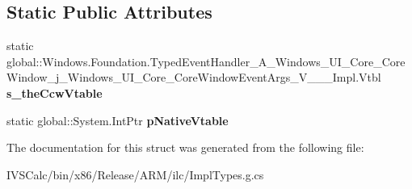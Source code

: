 \subsection*{Static Public Attributes}
\begin{DoxyCompactItemize}
\item 
\mbox{\label{struct_windows_1_1_foundation_1_1_typed_event_handler___a___windows___u_i___core___core_window__f96fd82f4e79c9942232efb7e426aa23_abc059c8fdd29268239d2ff5599f3475b}} 
static global\+::\+Windows.\+Foundation.\+Typed\+Event\+Handler\+\_\+\+A\+\_\+\+Windows\+\_\+\+U\+I\+\_\+\+Core\+\_\+\+Core\+Window\+\_\+j\+\_\+\+Windows\+\_\+\+U\+I\+\_\+\+Core\+\_\+\+Core\+Window\+Event\+Args\+\_\+\+V\+\_\+\+\_\+\+\_\+\+Impl.\+Vtbl {\bfseries s\+\_\+the\+Ccw\+Vtable}
\item 
\mbox{\label{struct_windows_1_1_foundation_1_1_typed_event_handler___a___windows___u_i___core___core_window__f96fd82f4e79c9942232efb7e426aa23_ab63d1913aa3dffb40fe25df034e7fadf}} 
static global\+::\+System.\+Int\+Ptr {\bfseries p\+Native\+Vtable}
\end{DoxyCompactItemize}


The documentation for this struct was generated from the following file\+:\begin{DoxyCompactItemize}
\item 
I\+V\+S\+Calc/bin/x86/\+Release/\+A\+R\+M/ilc/Impl\+Types.\+g.\+cs\end{DoxyCompactItemize}
